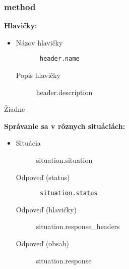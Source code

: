 \subsubsection{ {{method}} }
\noindent\textbf{Hlavičky:}
\begin{itemize}
\item
\begin{description}
\item[Názov hlavičky]\texttt{ {{header.name}} }
\item[Popis hlavičky] {{header.description}} 
\end{description}
\end{itemize}
Žiadne

\noindent\textbf{Správanie sa v rôznych situáciách:}
\begin{itemize}
\item
\begin{description}
\item[Situácia]
{{situation.situation}}
\item[Odpoveď (status)]
\texttt{ {{situation.status}} }
\item[Odpoveď (hlavičky)]
{{situation.response_headers}}
\item[Odpoveď (obsah)]
{{situation.response}}
\end{description}
\end{itemize}

